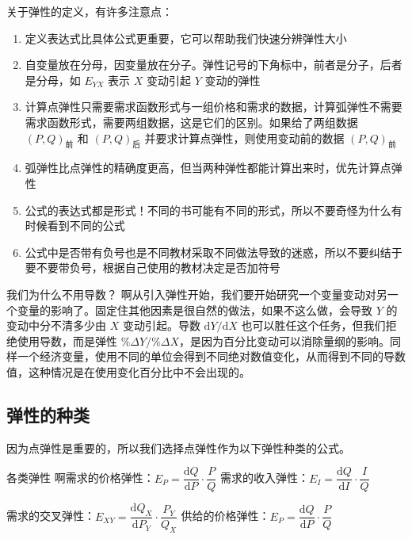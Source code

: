 关于弹性的定义，有许多注意点：

\begin{enumerate}
    \item 定义表达式比具体公式更重要，它可以帮助我们快速分辨弹性大小
    \item 自变量放在分母，因变量放在分子。弹性记号的下角标中，前者是分子，后者是分母，如 $E_{YX}$ 表示 $X$ 变动引起 $Y$ 变动的弹性
    \item 计算点弹性只需要需求函数形式与一组价格和需求的数据，计算弧弹性不需要需求函数形式，需要两组数据，这是它们的区别。如果给了两组数据 $\left(P,Q\right)_{\text{前}}$ 和 $\left(P,Q\right)_{\text{后}}$ 并要求计算点弹性，则使用变动前的数据 $\left(P,Q\right)_{\text{前}}$
    \item 弧弹性比点弹性的精确度更高，但当两种弹性都能计算出来时，优先计算点弹性
    \item 公式的表达式都是形式！不同的书可能有不同的形式，所以不要奇怪为什么有时候看到不同的公式
    \item 公式中是否带有负号也是不同教材采取不同做法导致的迷惑，所以不要纠结于要不要带负号，根据自己使用的教材决定是否加符号
\end{enumerate}

\begin{mantan}[breakable]{我们为什么不用导数？}
    啊从引入弹性开始，我们要开始研究一个变量变动对另一个变量的影响了。固定住其他因素是很自然的做法，如果不这么做，会导致 $Y$ 的变动中分不清多少由 $X$ 变动引起。导数 $\mathrm dY/\mathrm dX$ 也可以胜任这个任务，但我们拒绝使用导数，而是弹性 $\%\Delta Y/\%\Delta X$，是因为百分比变动可以消除量纲的影响。同样一个经济变量，使用不同的单位会得到不同绝对数值变化，从而得到不同的导数值，这种情况是在使用变化百分比中不会出现的。
\end{mantan}

\subsection{弹性的种类}

因为点弹性是重要的，所以我们选择点弹性作为以下弹性种类的公式。

\begin{dingyi}[breakable]{各类弹性}
    啊需求的价格弹性：$E_{P}=\dfrac{\mathrm dQ}{\mathrm dP}\cdot\dfrac{P}{Q}$ \quad\quad 需求的收入弹性：$E_{I}=\dfrac{\mathrm dQ}{\mathrm dI}\cdot\dfrac{I}{Q}$
    \vspace{0.5em}

    需求的交叉弹性：$E_{XY}=\dfrac{\mathrm dQ_X}{\mathrm dP_Y}\cdot\dfrac{P_Y}{Q_X}$ \quad\quad 供给的价格弹性：$E_{P}=\dfrac{\mathrm dQ}{\mathrm dP}\cdot\dfrac{P}{Q}$
\end{dingyi}

